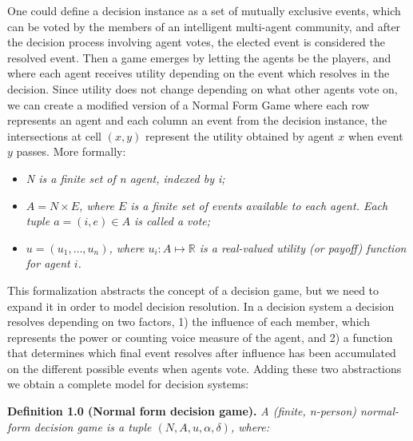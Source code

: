 One could define a decision instance as a set of mutually exclusive events, which can be voted by the members of an intelligent multi-agent community, and after the decision process involving agent votes, the elected event is considered the resolved event. Then a game emerges by letting the agents be the players, and where each agent receives utility depending on the event which resolves in the decision.  Since utility does not change depending on what other agents vote on, we can create a modified version of a Normal Form Game where each row represents an agent and each column an event from the decision instance, the intersections at cell $(x,y)$ represent the utility obtained by agent $x$ when event $y$ passes. More formally:

\begin{itemize}
  \item \textit{N is a finite set of n agent, indexed by i;}
  \item \textit{$A = N \times E $, where $E$ is a finite set of events available to each agent. Each tuple $ a = (i, e) \in A $ is called a vote;}
  \item \textit{$u = (u_{1}, \dots , u_{n}) $, where $ u_{i} : A \mapsto \mathbb{R} $ is a real-valued utility (or payoff) function for agent $i$.}
\end{itemize}

This formalization abstracts the concept of a decision game, but we need to expand it in order to model decision resolution. In a decision system a decision resolves depending on two factors, 1) the influence of each member, which represents the power or counting voice measure of the agent, and 2) a function that determines which final event resolves after influence has been accumulated on the different possible events when agents vote. Adding these two abstractions we obtain a complete model for decision systems:

\textbf{Definition 1.0 (Normal form decision game).} \textit{A (finite, n-person) normal-form decision game is a tuple $(N, A, u, \alpha, \delta)$, where:}

